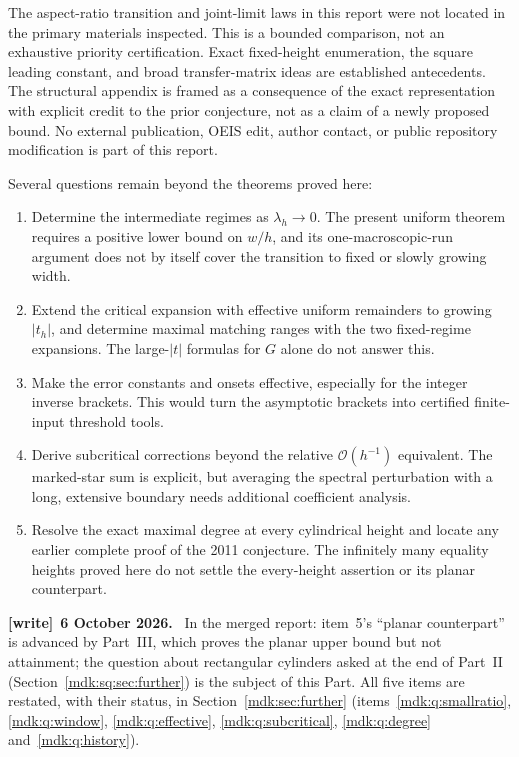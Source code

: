 \documentclass[11pt,letterpaper]{article}
\numberwithin{equation}{section}
\theoremstyle{remark}\newtheorem{remark}[theorem]{Remark}
\newcommand{\Oh}{\mathcal O}\newcommand{\Q}{\mathbb Q}\newcommand{\N}{\mathbb N}\newcommand{\R}{\mathbb R}
\newenvironment{writenote}[1][]{\par\smallskip\begingroup\small
 \noindent\textbf{[write]}\if\relax\detokenize{#1}\relax\else~\textbf{#1.}\fi\ }%
 {\par\endgroup\smallskip}
\begin{document}
The aspect-ratio transition and joint-limit laws in this report were not located in the primary materials inspected. This is a bounded comparison, not an exhaustive priority certification. Exact fixed-height enumeration, the square leading constant, and broad transfer-matrix ideas are established antecedents. The structural appendix is framed as a consequence of the exact representation with explicit credit to the prior conjecture, not as a claim of a newly proposed bound. No external publication, OEIS edit, author contact, or public repository modification is part of this report.

Several questions remain beyond the theorems proved here:
\begin{enumerate}[leftmargin=1.6em]
\item Determine the intermediate regimes as $\lambda_h\to0$. The present uniform theorem requires a positive lower bound on $w/h$, and its one-macroscopic-run argument does not by itself cover the transition to fixed or slowly growing width.
\item Extend the critical expansion with effective uniform remainders to growing $|t_h|$, and determine maximal matching ranges with the two fixed-regime expansions. The large-$|t|$ formulas for $G$ alone do not answer this.
\item Make the error constants and onsets effective, especially for the integer inverse brackets. This would turn the asymptotic brackets into certified finite-input threshold tools.
\item Derive subcritical corrections beyond the relative $\Oh(h^{-1})$ equivalent. The marked-star sum is explicit, but averaging the spectral perturbation with a long, extensive boundary needs additional coefficient analysis.
\item Resolve the exact maximal degree at every cylindrical height and locate any earlier complete proof of the 2011 conjecture. The infinitely many equality heights proved here do not settle the every-height assertion or its planar counterpart.
\end{enumerate}
\begin{writenote}[6 October 2026]
In the merged report: item~5's ``planar counterpart'' is advanced by Part~III, which proves the planar upper bound but not attainment; the question about rectangular cylinders asked at the end of Part~II (Section~\ref{mdk:sq:sec:further}) is the subject of this Part. All five items are restated, with their status, in Section~\ref{mdk:sec:further} (items~\ref{mdk:q:smallratio}, \ref{mdk:q:window}, \ref{mdk:q:effective}, \ref{mdk:q:subcritical}, \ref{mdk:q:degree} and~\ref{mdk:q:history}).
\end{writenote}
\clearpage
\setcounter{section}{10}
\renewcommand{\thesection}{\arabic{section}}
\makeatletter{}\makeatother
\end{document}
